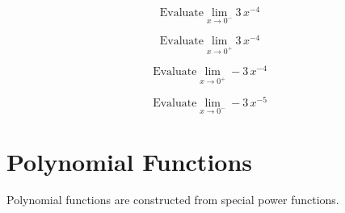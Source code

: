 \documentclass{ximera}
\begin{document}
\begin{question}

\[ \text{Evaluate} \lim_{x \to 0^-} 3 \, x^{-4} \]

\begin{multipleChoice}
\choice {$-\infty$}
\choice [correct]{$\infty$}
\end{multipleChoice}
\end{question}




\begin{question}

\[ \text{Evaluate} \lim_{x \to 0^+} 3 \, x^{-4} \]

\begin{multipleChoice}
\choice {$-\infty$}
\choice [correct]{$\infty$}
\end{multipleChoice}
\end{question}




\begin{question}

\[ \text{Evaluate} \lim_{x \to 0^+} -3 \, x^{-4} \]

\begin{multipleChoice}
\choice [correct]{$-\infty$}
\choice {$\infty$}
\end{multipleChoice}
\end{question}




\begin{question}

\[ \text{Evaluate} \lim_{x \to 0^-} -3 \, x^{-5} \]

\begin{multipleChoice}
\choice {$-\infty$}
\choice [correct]{$\infty$}
\end{multipleChoice}
\end{question}




















\section*{Polynomial Functions}

Polynomial functions are constructed from special power functions.
\end{document}
